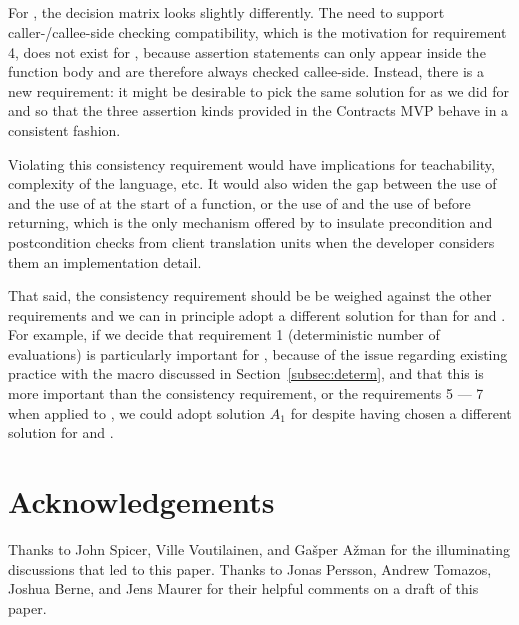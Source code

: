 \subsection{}
For , the decision matrix looks slightly differently. The need to support caller-/callee-side checking compatibility, which is the motivation for requirement 4, does not exist for , because assertion statements can only appear inside the function body and are therefore always checked callee-side. Instead, there is a new requirement: it might be desirable to pick the same solution for  as we did for  and  so that the three assertion kinds provided in the Contracts MVP behave in a consistent fashion.

Violating this consistency requirement would have implications for teachability, complexity of the language, etc. It would also widen the gap between the use of  and the use of  at the start
of a function, or the use of  and the use of  before returning, which is the only mechanism offered by \cite{P2900R6} to insulate precondition and postcondition checks from client translation units when the developer considers them an implementation detail.

That said, the consistency requirement should be be weighed against the other requirements and we can in principle adopt a different solution for   than for  and . For example, if we decide that requirement 1 (deterministic number of evaluations) is particularly important for , because of the issue regarding existing practice with the  macro discussed in Section~\ref{subsec:determ}, and that this is more important than the consistency requirement, or the requirements 5 --- 7 when applied to , we could adopt solution $A_1$ for  despite having chosen a different solution for  and .




\section*{Acknowledgements}
Thanks to John Spicer, Ville Voutilainen, and Ga\v sper A\v zman for the illuminating discussions that led to this paper. Thanks to Jonas Persson, Andrew Tomazos, Joshua Berne, and Jens Maurer for their helpful comments on a draft of this paper.


\renewcommand{\bibname}{References}





